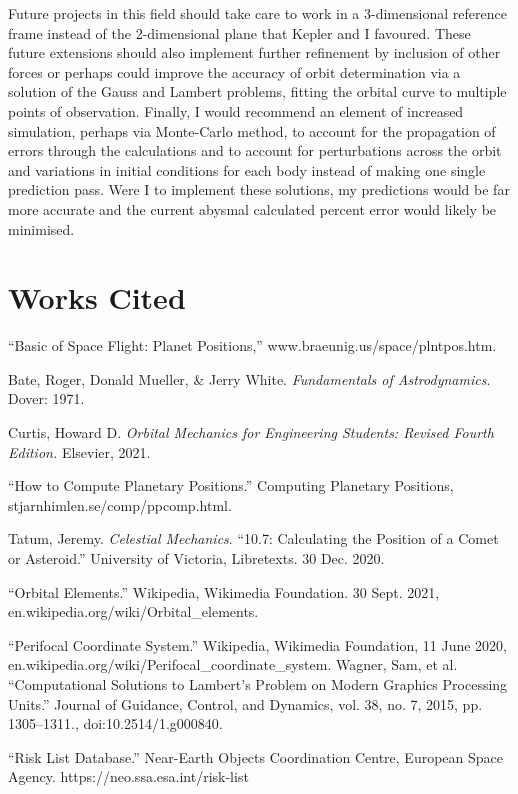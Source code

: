 \documentclass[12pt]{article}
\begin{document}
Future projects in this field should take care to work in a 3-dimensional reference frame instead of the 2-dimensional plane that Kepler and I favoured. These future extensions should also implement further refinement by inclusion of other forces or perhaps could improve the accuracy of orbit determination via a solution of the Gauss and Lambert problems, fitting the orbital curve to multiple points of observation. Finally, I would recommend an element of increased simulation, perhaps via Monte-Carlo method, to account for the propagation of errors through the calculations and to account for perturbations across the orbit and variations in initial conditions for each body instead of making one single prediction pass. Were I to implement these solutions, my predictions would be far more accurate and the current abysmal calculated percent error would likely be minimised.

\section{Works Cited}

“Basic of Space Flight: Planet Positions,” www.braeunig.us/space/plntpos.htm.

Bate, Roger, Donald Mueller, \& Jerry White. \emph{Fundamentals of Astrodynamics}. Dover: 1971.

Curtis, Howard D. \emph{Orbital Mechanics for Engineering Students: Revised Fourth Edition.} Elsevier, 2021.

“How to Compute Planetary Positions.” Computing Planetary Positions, stjarnhimlen.se/comp/ppcomp.html.

Tatum, Jeremy. \emph{Celestial Mechanics}. “10.7: Calculating the Position of a Comet or Asteroid.” University of Victoria, Libretexts. 30 Dec. 2020.

“Orbital Elements.” Wikipedia, Wikimedia Foundation. 30 Sept. 2021,\\ 
en.wikipedia.org/wiki/Orbital\_elements.

“Perifocal Coordinate System.” Wikipedia, Wikimedia Foundation, 11 June 2020, en.wikipedia.org/wiki/Perifocal\_coordinate\_system.
Wagner, Sam, et al. “Computational Solutions to Lambert’s Problem on Modern Graphics Processing Units.” Journal of Guidance, Control, and Dynamics, vol. 38, no. 7, 2015, pp. 1305–1311., doi:10.2514/1.g000840.

“Risk List Database.” Near-Earth Objects Coordination Centre, European Space Agency. https://neo.ssa.esa.int/risk-list 
\end{document}
